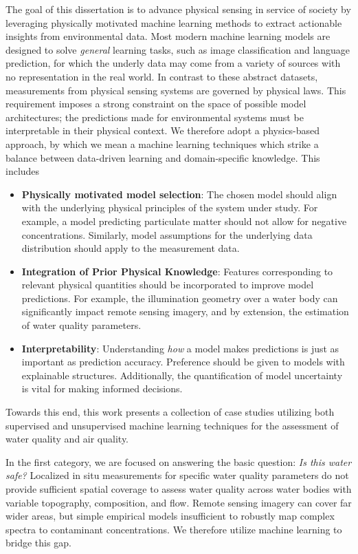 The goal of this dissertation is to advance physical sensing in service of
society by leveraging physically motivated machine learning methods to extract
actionable insights from environmental data. Most modern machine learning models
are designed to solve \textit{general} learning tasks, such as image
classification and language prediction, for which the underly data may come
from a variety of sources with no representation in the real world.
In contrast to these abstract datasets, measurements from physical sensing systems
are governed by physical laws. This requirement imposes a strong constraint on
the space of possible model architectures; the predictions made
for environmental systems must be interpretable in their physical context. We
therefore adopt a physics-based approach, by which we mean a machine learning
techniques which strike a balance between data-driven learning and domain-specific
knowledge. This includes
\begin{itemize}
\item \textbf{Physically motivated model selection}: The chosen model should
  align with the underlying physical principles of the system under study. For
  example, a model predicting particulate matter should not allow for
  negative concentrations. Similarly, model assumptions for the underlying data
  distribution should apply to the measurement data.
\item \textbf{Integration of Prior Physical Knowledge}: Features corresponding
  to relevant physical quantities should be incorporated to improve model
  predictions. For example, the illumination geometry over a water body can
  significantly impact remote sensing imagery, and by extension, the
  estimation of water quality parameters.
\item \textbf{Interpretability}: Understanding \textit{how} a model makes
  predictions is just as important as prediction accuracy. Preference should be
  given to models with explainable structures. Additionally, the quantification of
  model uncertainty is vital for making informed decisions.
\end{itemize}
Towards this end, this work presents a collection of case studies utilizing both
supervised and unsupervised machine learning techniques for the assessment of
water quality and air quality.

In the first category, we are focused on answering the basic question:
\textit{Is this water safe?} Localized in situ measurements for specific water
quality parameters do not provide sufficient spatial coverage to assess water
quality across water bodies with variable topography, composition, and flow. Remote
sensing imagery can cover far wider areas, but simple empirical models
insufficient to robustly map complex spectra to contaminant concentrations. We
therefore utilize machine learning to bridge this gap.

